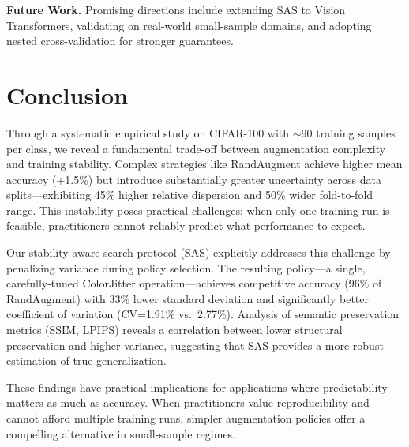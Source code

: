 \documentclass[conference,letterpaper]{IEEEtran}
\begin{document}
\textbf{Future Work.} Promising directions include extending SAS to Vision Transformers, validating on real-world small-sample domains, and adopting nested cross-validation for stronger guarantees.

\section{Conclusion}
Through a systematic empirical study on CIFAR-100 with $\sim$90 training samples per class, we reveal a fundamental trade-off between augmentation complexity and training stability. Complex strategies like RandAugment achieve higher mean accuracy (+1.5\%) but introduce substantially greater uncertainty across data splits---exhibiting 45\% higher relative dispersion and 50\% wider fold-to-fold range. This instability poses practical challenges: when only one training run is feasible, practitioners cannot reliably predict what performance to expect.

Our stability-aware search protocol (SAS) explicitly addresses this challenge by penalizing variance during policy selection. The resulting policy---a single, carefully-tuned ColorJitter operation---achieves competitive accuracy (96\% of RandAugment) with 33\% lower standard deviation and significantly better coefficient of variation (CV=1.91\% vs.\ 2.77\%). Analysis of semantic preservation metrics (SSIM, LPIPS) reveals a correlation between lower structural preservation and higher variance, suggesting that SAS provides a more robust estimation of true generalization.

These findings have practical implications for applications where predictability matters as much as accuracy. When practitioners value reproducibility and cannot afford multiple training runs, simpler augmentation policies offer a compelling alternative in small-sample regimes.



\end{document}
